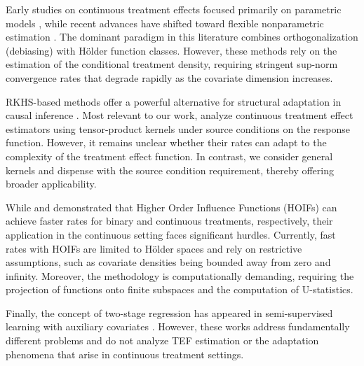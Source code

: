 \documentclass[english,11pt]{article}
\begin{document}
Early studies on continuous treatment effects focused primarily on parametric models \citep{robins2000marginal, laan2003unified, diaz2013targeted}, while recent advances have shifted toward flexible nonparametric estimation \citep{kennedy2017non, semenova2021debiased,bonvini2022fast,colangelo2025double,takatsu2025debiased}. The dominant paradigm in this literature combines orthogonalization (debiasing) with Hölder function classes. However, these methods rely on the estimation of the conditional treatment density, requiring stringent sup-norm convergence rates that degrade rapidly as the covariate dimension increases.

RKHS-based methods offer a powerful alternative for structural adaptation in causal inference \citep{nie2021quasi,kim2021statistical,mou2023kernel,singh2024kernel,hirshberg2021augmented,kim2025transfer}. Most relevant to our work, \citet{singh2022generalized,singh2024kernel} analyze continuous treatment effect estimators using tensor-product kernels under source conditions on the response function. However, it remains unclear whether their rates can adapt to the complexity of the treatment effect function. In contrast, we consider general kernels and dispense with the source condition requirement, thereby offering broader applicability.

While \citet{robins2008higher} and \citet{bonvini2022fast} demonstrated that Higher Order Influence Functions (HOIFs) can achieve faster rates for binary and continuous treatments, respectively, their application in the continuous setting faces significant hurdles. Currently, fast rates with HOIFs are limited to Hölder spaces and rely on restrictive assumptions, such as covariate densities being bounded away from zero and infinity. Moreover, the methodology is computationally demanding, requiring the projection of functions onto finite subspaces and the computation of U-statistics.

Finally, the concept of two-stage regression has appeared in semi-supervised learning with auxiliary covariates \citep{liu2023augmented,XWa24}. However, these works address fundamentally different problems and do not analyze TEF estimation or the adaptation phenomena that arise in continuous treatment settings.
\end{document}
